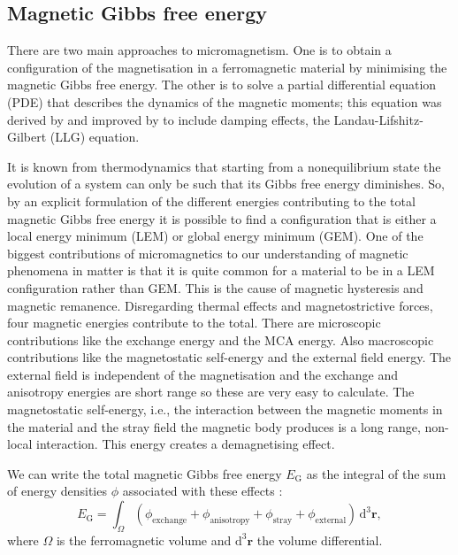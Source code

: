 \subsection{Magnetic Gibbs free energy}
There are two main approaches to micromagnetism. One is to obtain a configuration of the magnetisation in a ferromagnetic material by minimising the magnetic Gibbs free energy. The other is to solve a partial differential equation (PDE) that describes the dynamics of the magnetic moments; this equation was derived by \citet{Landau1935} and improved by \citet{Gilbert2004} to include damping effects, the Landau-Lifshitz-Gilbert (LLG) equation.\par

It is known from thermodynamics that starting from a nonequilibrium state the evolution of a system can only be such that its Gibbs free energy diminishes. So, by an explicit formulation of the different energies contributing to the total magnetic Gibbs free energy it is possible to find a configuration that is either a local energy minimum (LEM) or global energy minimum (GEM). One of the biggest contributions of micromagnetics to our understanding of magnetic phenomena in matter is that it is quite common for a material to be in a LEM configuration rather than GEM. This is the cause of magnetic hysteresis and magnetic remanence. Disregarding thermal effects and magnetostrictive forces, four magnetic energies contribute to the total. There are microscopic contributions like the exchange energy and the MCA energy. Also macroscopic contributions like the magnetostatic self-energy and the external field energy. The external field is independent of the magnetisation and the exchange and anisotropy energies are short range so these are very easy to calculate. The magnetostatic self-energy, i.e., the interaction between the magnetic moments in the material and the stray field the magnetic body produces is a long range, non-local interaction. This energy creates a demagnetising effect.\par

We can write the total magnetic Gibbs free energy $E_\text{G}$ as the integral of the sum of energy densities $\phi$ associated with these effects \citep{Brown}:
\begin{equation}\label{gibbs0}
E_{\text{G}} = \int_{\Omega} (\phi_{\text{exchange}} + \phi_{\text{anisotropy}} + \phi_{\text{stray}} + \phi_{\text{external}})\, \text{d}^3\boldsymbol{r},
\end{equation}
where $\Omega$ is the ferromagnetic volume and $\text{d}^3\boldsymbol{r}$ the volume differential.\par

